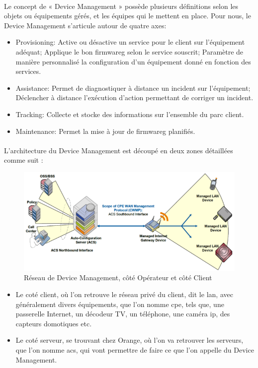 \documentclass[12pt,a4paper]{report}
\begin{document}
\paragraph*{}
Le concept de « Device Management » possède plusieurs définitions selon les objets ou équipements gérés, et les équipes qui le mettent en place. Pour nous, le Device Management s'articule autour de quatre axes:
\begin{itemize}
\subparagraph*{}
\item Provisioning: Active ou désactive un service pour le client sur l'équipement adéquat; Applique le bon \gls{firmwareg} selon le service souscrit; Paramètre de manière personnalisé la configuration d'un équipement donné en fonction des services.
\item Assistance: Permet de diagnostiquer à distance un incident sur l'équipement; Déclencher à distance l'exécution d'action permettant de corriger un incident.
\item Tracking: Collecte et stocke des informations sur l'ensemble du parc client.
\item Maintenance: Permet la mise à jour de \gls{firmwareg} planifiés.
\end{itemize}
\paragraph*{}
L'architecture du Device Management est découpé en deux zones détaillées comme suit : 
\begin{figure}[!ht]
    \center
    \includegraphics[scale=0.7]{./img/DM-TR-069-screen.png}
    \caption{Réseau de Device Management, côté Opérateur et côté Client}
\end{figure}
\begin{itemize}
\subparagraph*{}
\item Le coté client, où l'on retrouve le réseau privé du client, dit le \gls{lan}, avec généralement divers équipements, que l'on nomme \gls{cpe}, tels que, une passerelle Internet, un décodeur TV, un téléphone, une caméra \gls{ip}, des capteurs domotiques etc.
\item Le coté serveur, se trouvant chez Orange, où l'on va retrouver les serveurs, que l'on nomme \gls{acs}, qui vont permettre de faire ce que l'on appelle du Device Management.
\end{itemize}
\end{document}
